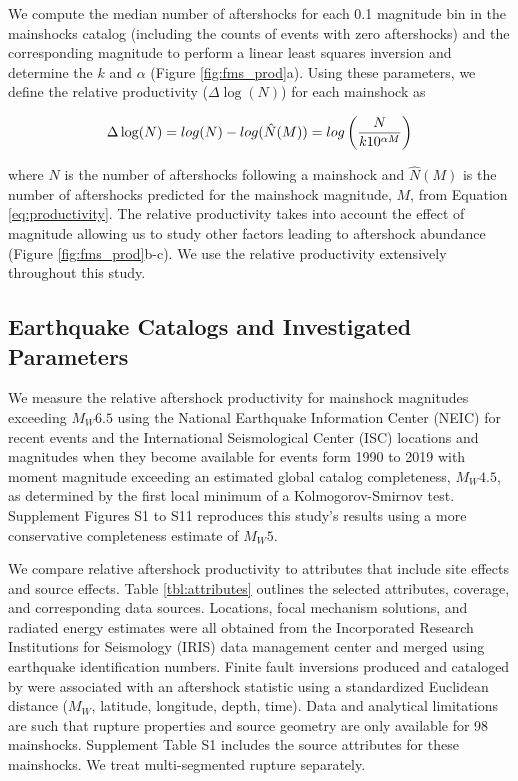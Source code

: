 \documentclass[draft]{agujournal2018}
\begin{document}
We compute the median number of aftershocks for each 0.1 magnitude bin in the mainshocks catalog (including the counts of events with zero aftershocks) and the corresponding magnitude to perform a linear least squares inversion and determine the $k$ and $\alpha$ (Figure \ref{fig:fms_prod}a). Using these parameters, we define the relative productivity ($\Delta \log(N)$) for each mainshock as 
%
\begin{linenomath*}
\begin{equation}{\label{eq:residual_productivity}}
    \Delta \log(N) = log(N) - log(\hat{N}(M)) = log\left(\dfrac{N}{k10^{\alpha M}}\right)
\end{equation}
\end{linenomath*}
%
where $N$ is the number of aftershocks following a mainshock and $\hat{N}(M)$ is the number of aftershocks predicted for the mainshock magnitude, $M$, from Equation \ref{eq:productivity}. The relative productivity takes into account the effect of magnitude allowing us to study other factors leading to aftershock abundance (Figure \ref{fig:fms_prod}b-c). We use the relative productivity extensively throughout this study. 

\subsection{Earthquake Catalogs and Investigated Parameters}

We measure the relative aftershock productivity for mainshock magnitudes exceeding $M_W6.5$ using the National Earthquake Information Center (NEIC) for recent events and the International Seismological Center (ISC) locations and magnitudes when they become available for events form 1990 to 2019 with moment magnitude exceeding an estimated global catalog completeness, $M_W4.5$, as determined by the first local minimum of a Kolmogorov-Smirnov test. Supplement Figures S1 to S11 reproduces this study's results using a more conservative completeness estimate of $M_W5$. 

We compare relative aftershock productivity to attributes that include site effects and source effects. Table \ref{tbl:attributes} outlines the selected attributes, coverage, and corresponding data sources. Locations, focal mechanism solutions, and radiated energy estimates were all obtained from the Incorporated Research Institutions for Seismology (IRIS) data management center and merged using earthquake identification numbers. Finite fault inversions produced and cataloged by \citet{Hayes2017} were associated with an aftershock statistic using a standardized Euclidean distance ($M_W$, latitude, longitude, depth, time).
Data and analytical limitations are such that rupture properties and source geometry are only available for 98 mainshocks. Supplement Table S1 \citep{Hayes2017} includes the source attributes for these mainshocks. We treat multi-segmented rupture separately.
\end{document}
